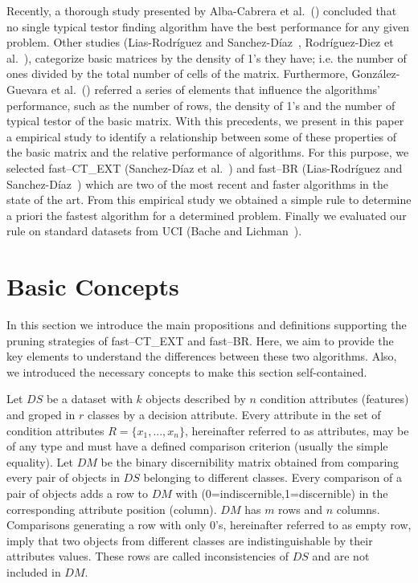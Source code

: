 \documentclass[citeauthoryear]{llncs}
\begin{document}
	Recently, a thorough study presented by Alba-Cabrera et al.~(\cite{Alba13}) concluded that no single typical testor finding algorithm have the best performance for any given problem. Other studies (Lias-Rodr\'iguez and Sanchez-D\'iaz~\cite{Lias2013}, Rodríguez-Diez et al.~\cite{Rodriguez15}), categorize basic matrices by the density of 1's they have; i.e. the number of ones divided by the total number of cells of the matrix. Furthermore, González-Guevara et al.~(\cite{Gonzalez15}) referred a series of elements that influence the algorithms' performance, such as the number of rows, the density of 1's and the number of typical testor of the basic matrix. With this precedents, we present in this paper a empirical study to identify a relationship between some of these properties of the basic matrix and the relative performance of algorithms. For this purpose, we selected fast--CT\_EXT (Sanchez-D\'iaz et al.~\cite{Sanchez2010}) and fast--BR (Lias-Rodr\'iguez and Sanchez-D\'iaz~\cite{Lias2013}) which are two of the most recent and faster algorithms in the state of the art. From this empirical study we obtained a simple rule to determine a priori the fastest algorithm for a determined problem. Finally we evaluated our rule on standard datasets from UCI (Bache and Lichman~\cite{Bache13}). 
	
%
\section{Basic Concepts}
%
	In this section we introduce the main propositions and definitions supporting the pruning strategies of fast--CT\_EXT and fast--BR. Here, we aim to provide the key elements to understand the differences between these two algorithms. Also, we introduced the necessary concepts to make this section self-contained.	
	
	Let $DS$ be a dataset with $k$ objects described by $n$ condition attributes (features) and groped in $r$ classes by a decision attribute. Every attribute in the set of condition attributes $R=\lbrace x_1,...,x_n \rbrace$, hereinafter referred to as attributes, may be of any type and must have a defined comparison criterion (usually the simple equality). Let $DM$ be the binary discernibility matrix obtained from comparing every pair of objects in $DS$ belonging to different classes. Every comparison of a pair of objects adds a row to $DM$ with (0=indiscernible,1=discernible) in the corresponding attribute position (column). $DM$ has $m$ rows and $n$ columns. Comparisons generating a row with only 0's, hereinafter referred to as empty row, imply that two objects from different classes are indistinguishable by their attributes values. These rows are called inconsistencies of $DS$ and are not included in $DM$.
	
\end{document}
